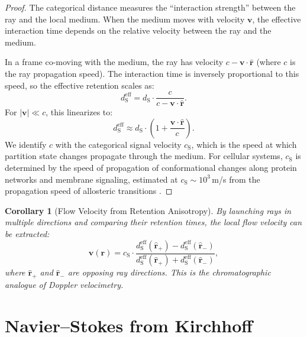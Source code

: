 \documentclass[11pt,twocolumn,a4paper]{article}
\newtheorem{corollary}[theorem]{Corollary}
\newcommand{\dS}{d_{\mathrm{S}}}
\newcommand{\cS}{c_{\mathrm{S}}}
\begin{document}
\begin{proof}
The categorical distance measures the ``interaction strength'' between
the ray and the local medium. When the medium moves with velocity
$\mathbf{v}$, the effective interaction time depends on the relative
velocity between the ray and the medium.

In a frame co-moving with the medium, the ray has velocity
$c - \mathbf{v} \cdot \hat{\mathbf{r}}$ (where $c$ is the ray
propagation speed). The interaction time is inversely proportional to
this speed, so the effective retention scales as:
\begin{equation}
\dS^{\mathrm{eff}} = \dS \cdot \frac{c}{c -
  \mathbf{v} \cdot \hat{\mathbf{r}}}.
\end{equation}
For $|\mathbf{v}| \ll c$, this linearizes to:
\begin{equation}
\dS^{\mathrm{eff}} \approx \dS \cdot \left(1 +
  \frac{\mathbf{v} \cdot \hat{\mathbf{r}}}{c}\right).
\end{equation}
We identify $c$ with the categorical signal velocity $\cS$, which is
the speed at which partition state changes propagate through the
medium. For cellular systems, $\cS$ is determined by the speed of
propagation of conformational changes along protein networks and
membrane signaling, estimated at $\cS \sim 10^3$\,m/s from the
propagation speed of allosteric transitions \citep{groel1997}.
\end{proof}

\begin{corollary}[Flow Velocity from Retention Anisotropy]
\label{cor:flow-velocity}
By launching rays in multiple directions and comparing their retention
times, the local flow velocity can be extracted:
\begin{equation}
\mathbf{v}(\mathbf{r}) = \cS \cdot \frac{\dS^{\mathrm{eff}}
  (\hat{\mathbf{r}}_+) - \dS^{\mathrm{eff}}(\hat{\mathbf{r}}_-)}
  {\dS^{\mathrm{eff}}(\hat{\mathbf{r}}_+) +
  \dS^{\mathrm{eff}}(\hat{\mathbf{r}}_-)},
\label{eq:flow-from-retention}
\end{equation}
where $\hat{\mathbf{r}}_+$ and $\hat{\mathbf{r}}_-$ are opposing ray
directions. This is the chromatographic analogue of Doppler
velocimetry.
\end{corollary}


\section{Navier--Stokes from Kirchhoff}
\label{sec:navier-stokes}
\end{document}
